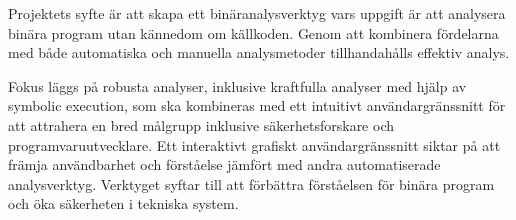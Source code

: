 Projektets syfte är att skapa ett binäranalysverktyg vars uppgift är att analysera
binära program utan kännedom om källkoden. Genom att kombinera fördelarna med både
automatiska och manuella analysmetoder tillhandahålls effektiv analys.

Fokus läggs på robusta analyser, inklusive kraftfulla analyser med hjälp av symbolic execution,
som ska kombineras med ett intuitivt användargränssnitt för att attrahera en bred
målgrupp inklusive säkerhetsforskare och programvaruutvecklare. Ett interaktivt grafiskt
användargränssnitt siktar på att främja användbarhet och förståelse jämfört med
andra automatiserade analysverktyg. Verktyget syftar till att förbättra
förståelsen för binära program och öka säkerheten i tekniska system.
